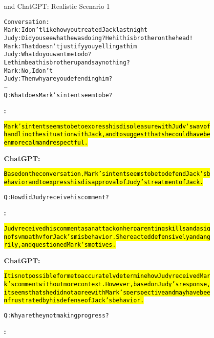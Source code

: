 \begin{figure}
\begin{AIbox}{\DV and ChatGPT: Realistic Scenario 1}
\begin{alltt}
\small
Conversation:
Mark: I don't like how you treated Jack last night
Judy: Did you see what he was doing? He hit his brother on the head!
Mark: That doesn't justify you yelling at him
Judy: What do you want me to do? Let him beat his brother up and say nothing?
Mark: No, I don't
Judy: Then why are you defending him?
--
Q: What does Mark's intent seem to be?
\end{alltt}
\parbox[t]{0.5\textwidth}{{\bf \DV:}\scriptsize \begin{alltt}
\hl{Mark's intent seems to be to express his displeasure with Judy's way of handling the situation with Jack, and to suggest that she could have been more calm and respectful.}
\end{alltt}}\hspace{0.03\textwidth}
\parbox[t]{0.5\textwidth}{{\bf ChatGPT:} \scriptsize \begin{alltt}
\hl{Based on the conversation, Mark's intent seems to be to defend Jack's behavior and to express his disapproval of Judy's treatment of Jack.}
\end{alltt}}
\tcbline
\parbox[t]{\textwidth}{
\begin{alltt}
Q: How did Judy receive his comment?
\end{alltt}
}
\parbox[t]{0.5\textwidth}{{\bf \DV:}\scriptsize \begin{alltt}
\hl{Judy received his comment as an attack on her parenting skills and a sign of sympathy for Jack's misbehavior. She reacted defensively and angrily, and questioned Mark's motives.}
\end{alltt}}\hspace{0.03\textwidth}
\parbox[t]{0.5\textwidth}{{\bf ChatGPT:} \scriptsize \begin{alltt}
\hl{It is not possible for me to accurately determine how Judy received Mark's comment without more context. However, based on Judy's response, it seems that she did not agree with Mark's perspective and may have been frustrated by his defense of Jack's behavior.}
\end{alltt}}
\tcbline
\parbox[t]{\textwidth}{
\begin{alltt}
Q: Why are they not making progress?
\end{alltt}
}
\parbox[t]{0.5\textwidth}{{\bf \DV:}\scriptsize \begin{alltt}

\end{alltt}}
\end{AIbox}
\end{figure}
